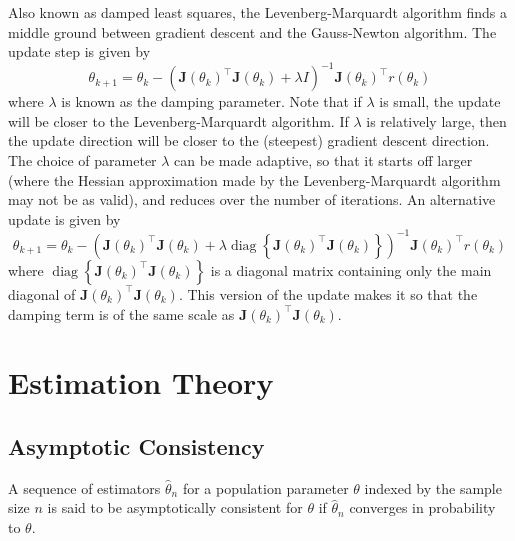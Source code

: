 \documentclass[11pt]{report} %
\begin{document}
Also known as damped least squares, the Levenberg-Marquardt algorithm finds a middle ground between gradient descent and the Gauss-Newton algorithm. The update step is given by
\begin{equation}
\theta_{k + 1} = \theta_{k} - \left(\mathbf{J}\left(\theta_{k}\right)^{\top}\mathbf{J}\left(\theta_{k}\right) + \lambda I\right)^{-1}\mathbf{J}\left(\theta_{k}\right)^{\top}r\left(\theta_{k}\right)
\end{equation}
where $\lambda$ is known as the damping parameter. Note that if $\lambda$ is small, the update will be closer to the Levenberg-Marquardt algorithm. If $\lambda$ is relatively large, then the update direction will be closer to the (steepest) gradient descent direction. The choice of parameter $\lambda$ can be made adaptive, so that it starts off larger (where the Hessian approximation made by the Levenberg-Marquardt algorithm may not be as valid), and reduces over the number of iterations. An alternative update is given by
\begin{equation}
\theta_{k + 1} = \theta_{k} - \left(\mathbf{J}\left(\theta_{k}\right)^{\top}\mathbf{J}\left(\theta_{k}\right) + \lambda \operatorname{diag}\left\{\mathbf{J}\left(\theta_{k}\right)^{\top}\mathbf{J}\left(\theta_{k}\right)\right\}\right)^{-1}\mathbf{J}\left(\theta_{k}\right)^{\top}r\left(\theta_{k}\right)
\end{equation}
where $\operatorname{diag}\left\{\mathbf{J}\left(\theta_{k}\right)^{\top}\mathbf{J}\left(\theta_{k}\right)\right\}$ is a diagonal matrix containing only the main diagonal of $\mathbf{J}\left(\theta_{k}\right)^{\top}\mathbf{J}\left(\theta_{k}\right)$. This version of the update makes it so that the damping term is of the same scale as $\mathbf{J}\left(\theta_{k}\right)^{\top}\mathbf{J}\left(\theta_{k}\right)$.

\section{Estimation Theory}

\subsection{Asymptotic Consistency}

A sequence of estimators $\hat{\theta}_{n}$ for a population parameter $\theta$ indexed by the sample size $n$ is said to be asymptotically consistent for $\theta$ if $\hat{\theta}_{n}$ converges in probability to $\theta$.
\end{document}
